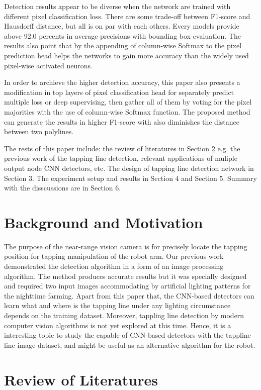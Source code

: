 \documentclass[default,pdflatex,iicol]{sn-jnl}%
\begin{document}
Detection results appear to be diverse when the network are trained with different pixel classification loss. There are some trade-off between F1-score and Hausdorff distance, but all is on par with each others. Every models provide above 92.0 percents in average precisions with bounding box evaluation. The results also point that by the appending of column-wise Softmax to the pixel prediction head helps the networks to gain more accuracy than the widely used pixel-wise activated neurons. 

In order to archieve the higher detection accuracy, this paper also presents a modification in top layers of pixel classification head for separately predict multiple loss or deep supervising, then gather all of them by voting for the pixel majorities with the use of column-wise Softmax function. The proposed method can generate the results in higher F1-score with also diminishes the distance between two polylines.

The rests of this paper include: the review of literatures in Section \ref{sec-review} \textemdash e.g. the previous work of the tapping line detection, relevant applications of muliple output node CNN detectors, etc. The design of tapping line detection network in Section 3. The experiment setup and results in Section 4 and Section 5. Summary with the disscussions are in Section 6.

\section{Background and Motivation}\label{sec-background}
The purpose of the near-range vision camera is for precisely locate the tapping position for tapping manipulation of the robot arm. Our previous work \cite{Wongtanawijit_2021} demonstrated the detection algorithm in a form of an image processing algorithm. The method produces accurate results but it was specially designed and required two input images accommodating by artificial lighting patterns for the nighttime farming. Apart from this paper that, the CNN-based detectors can learn what and where is the tapping line under any lighting circumstance depends on the training dataset. Moreover, tappling line detection by modern computer vision algorithms is not yet explored at this time. Hence, it is a interesting topic to study the capable of CNN-based detectors with the tappline line image dataset, and might be useful as an alternative algorithm for the robot.

\section{Review of Literatures}\label{sec-review}
\end{document}
